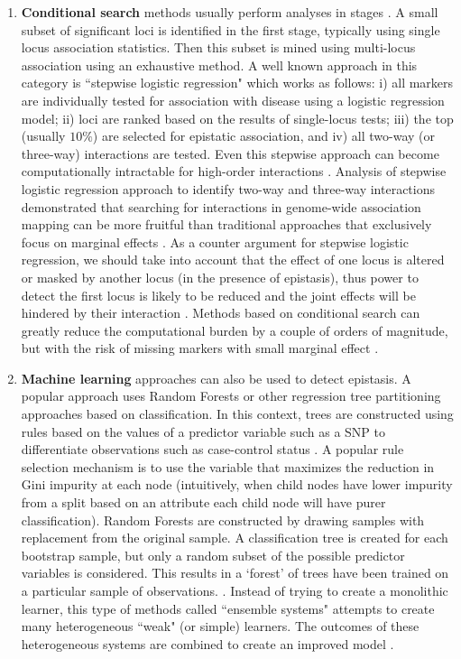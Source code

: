 \begin{enumerate}
	\item \textbf{Conditional search} methods usually perform analyses in stages \cite{li2011detecting}.
A small subset of significant loci is identified in the first stage, typically using single locus association statistics.
Then this subset is mined using multi-locus association using an exhaustive method. 
A well known approach in this category is ``stepwise logistic regression" which works as follows:
i) all markers are individually tested for association with disease using a logistic regression model;
ii) loci are ranked based on the results of single-locus tests;
iii) the top (usually $10\%$) are selected for epistatic association, and
iv) all two-way (or three-way) interactions are tested. 
Even this stepwise approach can become computationally intractable for high-order interactions \cite{zhang2007bayesian}.
Analysis of stepwise logistic regression approach to identify two-way and three-way interactions demonstrated that searching for interactions in genome-wide association mapping can be more fruitful than traditional approaches that exclusively focus on marginal effects \cite{zhang2007bayesian}.
As a counter argument for stepwise logistic regression, we should take into account that the effect of one locus is altered or masked by another locus  (in the presence of epistasis), thus power to detect the first locus is likely to be reduced and the joint effects will be hindered by their interaction \cite{cordell2002epistasis}. 
Methods based on conditional search can greatly reduce the computational burden by a couple of orders of magnitude, but with the risk of missing markers with small marginal effect \cite{li2011detecting}.

	\item \textbf{Machine learning} approaches can also be used to detect epistasis.
A popular approach uses Random Forests \cite{li2011detecting} or other regression tree partitioning approaches based on classification.
In this context, trees are constructed using rules based on the values of a predictor variable such as a SNP to differentiate observations such as case-control status \cite{cordell2009detecting}.
A popular rule selection mechanism is to use the variable that maximizes the reduction in Gini impurity \cite{kuhn1995application} at each node (intuitively, when child nodes have lower impurity from a split based on an attribute each child node will have purer classification).
Random Forests are constructed by drawing samples with replacement from the original sample. 
A classification tree is created for each bootstrap sample, but only a random subset of the possible predictor variables is considered. 
This results in a `forest' of trees have been trained on a particular sample of observations. \cite{cordell2009detecting}.
Instead of trying to create a monolithic learner, this type of methods called ``ensemble systems" attempts to create many heterogeneous ``weak" (or simple) learners. 
The outcomes of these heterogeneous systems are combined to create an improved model \cite{li2011detecting}.


\end{enumerate}

